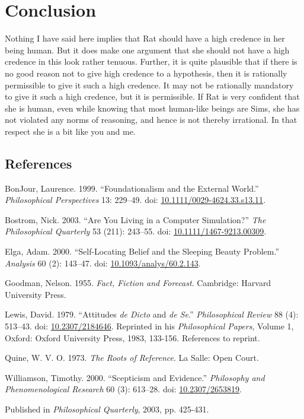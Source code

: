 \documentclass[
  11pt,
  letterpaper,
  DIV=11,
  numbers=noendperiod,
  twoside]{scrartcl}
\newlength{\cslhangindent}
\newenvironment{CSLReferences}[2] %
 {\begin{list}{}{%
  \setlength{\itemindent}{0pt}
  \setlength{\leftmargin}{0pt}
  \setlength{\parsep}{0pt}
  \ifodd #1
   \setlength{\leftmargin}{\cslhangindent}
   \setlength{\itemindent}{-1\cslhangindent}
  \fi
  \setlength{\itemsep}{#2\baselineskip}}}
 {\end{list}}
\begin{document}
\section{Conclusion}\label{conclusion}

Nothing I have said here implies that Rat should have a high credence in
her being human. But it does make one argument that she should not have
a high credence in this look rather tenuous. Further, it is quite
plausible that if there is no good reason not to give high credence to a
hypothesis, then it is rationally permissible to give it such a high
credence. It may not be rationally mandatory to give it such a high
credence, but it is permissible. If Rat is very confident that she is
human, even while knowing that most human-like beings are Sims, she has
not violated any norms of reasoning, and hence is not thereby
irrational. In that respect she is a bit like you and me.

\subsection*{References}\label{references}

\label{refs}
\begin{CSLReferences}{1}{0}
BonJour, Laurence. 1999. {``Foundationalism and the External World.''}
\emph{Philosophical Perspectives} 13: 229--49. doi:
\href{https://doi.org/10.1111/0029-4624.33.s13.11}{10.1111/0029-4624.33.s13.11}.

Bostrom, Nick. 2003. {``Are You Living in a Computer Simulation?''}
\emph{The Philosophical Quarterly} 53 (211): 243--55. doi:
\href{https://doi.org/10.1111/1467-9213.00309}{10.1111/1467-9213.00309}.

Elga, Adam. 2000. {``Self-Locating Belief and the Sleeping Beauty
Problem.''} \emph{Analysis} 60 (2): 143--47. doi:
\href{https://doi.org/10.1093/analys/60.2.143}{10.1093/analys/60.2.143}.

Goodman, Nelson. 1955. \emph{Fact, Fiction and Forecast}. Cambridge:
Harvard University Press.

Lewis, David. 1979. {``Attitudes \emph{de Dicto} and \emph{de Se}.''}
\emph{Philosophical Review} 88 (4): 513--43. doi:
\href{https://doi.org/10.2307/2184646}{10.2307/2184646}. Reprinted in
his \emph{Philosophical Papers}, Volume 1, Oxford: Oxford University
Press, 1983, 133-156. References to reprint.

Quine, W. V. O. 1973. \emph{The Roots of Reference}. La Salle: Open
Court.

Williamson, Timothy. 2000. {``{Scepticism and Evidence}.''}
\emph{Philosophy and Phenomenological Research} 60 (3): 613--28. doi:
\href{https://doi.org/10.2307/2653819}{10.2307/2653819}.

\end{CSLReferences}



\noindent Published in\emph{
Philosophical Quarterly}, 2003, pp. 425-431.
\end{document}
